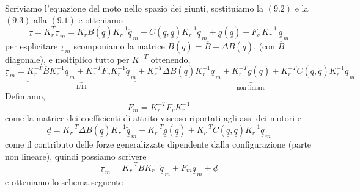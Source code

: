 \paragraph{}
Scriviamo l'equazione del moto nello spazio dei giunti, sostituiamo la $(9.2)$ e la $(9.3)$ alla $(9.1)$ e otteniamo
\begin{equation*}
	\underline{\tau} = K_r^T \underline{\tau}_{\,m} = K_r B(\underline{q})K_r^{-1}\ddot{\underline{q}}_{\,m} + C(\underline{q}, \underline{\dot{q}}) K_r^{-1} \underline{\dot{q}}_{\,m} + \underline{g}(\underline{q}) + F_v \,K_r^{-1} \,\underline{\dot{q}}_{\,m}
\end{equation*} 
per esplicitare $\underline{\tau}_{\,m}$ scomponiamo la matrice $B(\underline{q}) = \overline{B}+\Delta B(\underline{q})$, (con $\overline{B}$ diagonale), e moltiplico tutto per $K^{-T}$ ottenendo,
\begin{equation*}
	\underline{\tau}_{\,m} = \underbrace{K_r^{-T} \overline{B} K_r^{-1} \underline{\ddot{q}}_{\,m} + K_r^{-T} F_v K_r^{-1} \underline{\dot{q}}_{\,m}}_{\text{LTI}} + \underbrace{K_r^{-T} \Delta B(\underline{q}) K_r^{-1}\underline{\ddot{q}}_{\,m} + K_r^{-T} \underline{g}(\underline{q}) + K_r^{-T} C(\underline{q}, \underline{\dot{q}})K_r^{-1} \underline{\dot{q}}_{\,m}}_{\text{non lineare}}
\end{equation*}
Definiamo,
\begin{equation}
	F_m = K_r^{-T} F_v K_r^{-1}
\end{equation}
come la matrice dei coefficienti di attrito viscoso riportati agli assi dei motori e 
\begin{equation}
	\underline{d} = K_r^{-T} \Delta B(\underline{q}) K_r^{-1}\underline{\ddot{q}}_{\,m} + K_r^{-T} \underline{g}(\underline{q}) + K_r^{-T} C(\underline{q}, \underline{\dot{q}})K_r^{-1} \underline{\dot{q}}_{\,m}
\end{equation}
come il contributo delle forze generalizzate dipendente dalla configurazione (parte non lineare), quindi possiamo scrivere
\begin{equation}
	\underline{\tau}_{\,m} = K_r^{-T} \overline{B} K_r^{-1} \underline{\ddot{q}}_{\,m} + F_m\underline{\dot{q}}_{\,m} + \underline{d}
\end{equation}
e otteniamo lo schema seguente

